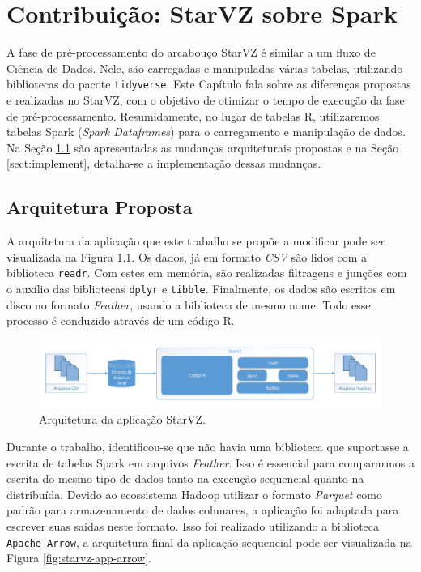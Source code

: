 \chapter{Contribuição: StarVZ sobre Spark} \label{ch:contribution}

A fase de pré-processamento do arcabouço StarVZ é similar a um fluxo de Ciência 
de Dados. Nele, são carregadas e manipuladas várias tabelas, utilizando 
bibliotecas do pacote \texttt{tidyverse}. Este Capítulo fala sobre as diferenças 
propostas e realizadas no StarVZ, com o objetivo de otimizar o tempo de 
execução da fase de pré-processamento. Resumidamente, no lugar de tabelas R, 
utilizaremos tabelas Spark (\emph{Spark Dataframes}) para o carregamento e manipulação de dados.
Na Seção \ref{sect:arch} são apresentadas as mudanças arquiteturais propostas
e na Seção \ref{sect:implement}, detalha-se a implementação dessas mudanças.

\section{Arquitetura Proposta} \label{sect:arch}

A arquitetura da aplicação que este trabalho se propõe a modificar pode ser 
visualizada na Figura \ref{fig:starvz-app}. Os dados, já em formato 
\textit{CSV} são lidos com a biblioteca \texttt{readr}. Com estes em memória, 
são realizadas filtragens e junções com o auxílio das bibliotecas \texttt{dplyr} 
e \texttt{tibble}. Finalmente, os dados são escritos em disco no formato 
\textit{Feather}, usando a biblioteca de mesmo nome. Todo esse processo é 
conduzido através de um código R.

\begin{figure}[ht]
 \centerline{\includegraphics[width=1\textwidth]{./img/starvz-arch.pdf}}
 \caption{Arquitetura da aplicação StarVZ.}
 \label{fig:starvz-app}
\end{figure}

Durante o trabalho, identificou-se que não havia uma biblioteca que suportasse a 
escrita de tabelas Spark em arquivos \textit{Feather}. Isso é essencial para 
compararmos a escrita do mesmo tipo de dados tanto na execução sequencial quanto 
na distribuída. Devido ao ecossistema Hadoop utilizar 
o formato \textit{Parquet} \cite{ref:parquet} como padrão para armazenamento de 
dados colunares, a aplicação foi adaptada para escrever suas saídas neste 
formato. Isso foi realizado utilizando a biblioteca \texttt{Apache Arrow}, a 
arquitetura final da aplicação sequencial pode ser visualizada na Figura 
\ref{fig:starvz-app-arrow}. 

